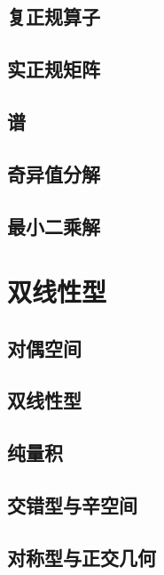 \documentclass[a4paper, 11pt]{ctexbook}
\begin{document}
        \section{复正规算子}
        \section{实正规矩阵}
        \section{谱}
        \section{奇异值分解}
        \section{最小二乘解}
    \chapter{双线性型}
        \section{对偶空间}
        \section{双线性型}
        \section{纯量积}
        \section{交错型与辛空间}
        \section{对称型与正交几何}
\end{document}
